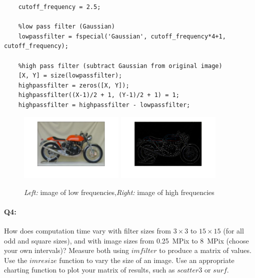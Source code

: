 	\begin{lstlisting}[style=Matlab-editor]
    %Standard deviation of the Gaussian blur.
    cutoff_frequency = 2.5;
    
    %low pass filter (Gaussian)
    lowpassfilter = fspecial('Gaussian', cutoff_frequency*4+1, cutoff_frequency);
    
    %high pass filter (subtract Gaussian from original image)
    [X, Y] = size(lowpassfilter);
    highpassfilter = zeros([X, Y]);
    highpassfilter((X-1)/2 + 1, (Y-1)/2 + 1) = 1;
    highpassfilter = highpassfilter - lowpassfilter;
	\end{lstlisting}
	\begin{figure}[h]
    \centering
    \includegraphics[width=5cm]{questions/low_frequencies1.jpg}
    \includegraphics[width=5cm]{questions/high_frequencies1.jpg}
    \caption{\emph{Left:} image of low frequencies,\emph{Right:} image of high frequencies}
    \end{figure}
	
	
	
	\pagebreak
	\paragraph{Q4:} How does computation time vary with filter sizes from $3\times3$ to $15\times15$ (for all odd and square sizes), and with image sizes from 0.25~MPix to 8~MPix (choose your own intervals)? Measure both using \href{https://www.mathworks.com/help/images/ref/imfilter.html}{$imfilter$} to produce a matrix of values. Use the \href{https://www.mathworks.com/help/images/ref/imresize.html}{$imresize$} function to vary the size of an image. Use an appropriate charting function to plot your matrix of results, such as \href{https://www.mathworks.com/help/matlab/ref/scatter3.html}{$scatter3$} or \href{https://www.mathworks.com/help/matlab/ref/surf.html}{$surf$}.
	
